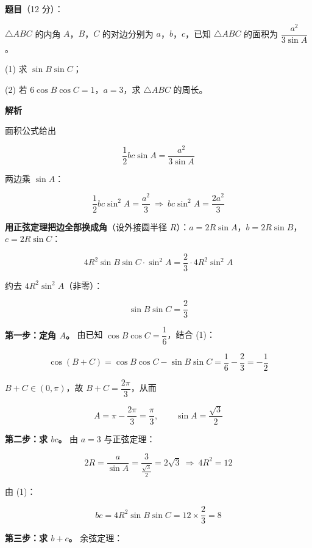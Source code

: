 \begin{answer}

\textbf{题目}（12 分）：

$\triangle ABC$ 的内角 $A$，$B$，$C$ 的对边分别为 $a$，$b$，$c$，已知 $\triangle ABC$ 的面积为 $\dfrac{a^{2}}{3\sin A}$。

  (1) 求 $\sin B\sin C$；

  (2) 若 $6\cos B\cos C=1$，$a=3$，求 $\triangle ABC$ 的周长。

\textbf{解析}


面积公式给出

\nopagebreak[4]
\[\frac12bc\sin A=\frac{a^{2}}{3\sin A}\]

两边乘 $\sin A$：

\nopagebreak[4]
\[\frac12bc\sin^{2}A=\frac{a^{2}}3\ \Longrightarrow\ bc\sin^{2}A=\frac{2a^{2}}3\]

\textbf{用正弦定理把边全部换成角}（设外接圆半径 $R$）：$a=2R\sin A$，$b=2R\sin B$，$c=2R\sin C$：

\nopagebreak[4]
\[4R^{2}\sin B\sin C\cdot\sin^{2}A=\frac23\cdot4R^{2}\sin^{2}A\]

约去 $4R^{2}\sin^{2}A$（非零）：

\nopagebreak[4]
\[\sin B\sin C=\frac23\]


\textbf{第一步：定角 $A$。} 由已知 $\cos B\cos C=\dfrac16$，结合 (1)：

\nopagebreak[4]
\[\cos(B+C)=\cos B\cos C-\sin B\sin C=\frac16-\frac23=-\frac12\]

$B+C\in(0,\pi)$，故 $B+C=\dfrac{2\pi}3$，从而

\nopagebreak[4]
\[A=\pi-\frac{2\pi}3=\frac\pi3,\qquad \sin A=\frac{\sqrt3}2\]

\textbf{第二步：求 $bc$。} 由 $a=3$ 与正弦定理：

\nopagebreak[4]
\[2R=\frac a{\sin A}=\frac3{\frac{\sqrt3}2}=2\sqrt3\ \Longrightarrow\ 4R^{2}=12\]

由 (1)：

\nopagebreak[4]
\[bc=4R^{2}\sin B\sin C=12\times\frac23=8\]

\textbf{第三步：求 $b+c$。} 余弦定理：


\end{answer}
